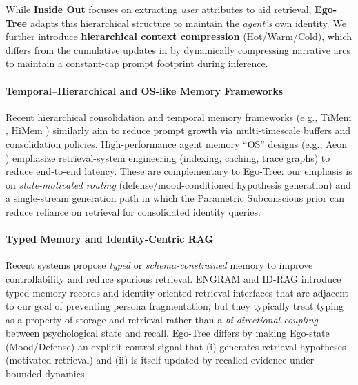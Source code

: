 \documentclass{article}
\begin{document}
While \textbf{Inside Out} focuses on extracting \textit{user} attributes to aid retrieval, \textbf{Ego-Tree} adapts this hierarchical structure to maintain the \textit{agent's} own identity. We further introduce \textbf{hierarchical context compression} (Hot/Warm/Cold), which differs from the cumulative updates in \cite{zhao2026inside} by dynamically compressing narrative arcs to maintain a constant-cap prompt footprint during inference.

\paragraph{Temporal--Hierarchical and OS-like Memory Frameworks}
Recent hierarchical consolidation and temporal memory frameworks (e.g., TiMem \cite{timem2025}, HiMem \cite{himem2025}) similarly aim to reduce prompt growth via multi-timescale buffers and consolidation policies. High-performance agent memory ``OS'' designs (e.g., Aeon \cite{aeon2025}) emphasize retrieval-system engineering (indexing, caching, trace graphs) to reduce end-to-end latency. These are complementary to Ego-Tree: our emphasis is on \emph{state-motivated routing} (defense/mood-conditioned hypothesis generation) and a single-stream generation path in which the Parametric Subconscious prior can reduce reliance on retrieval for consolidated identity queries.

\paragraph{Typed Memory and Identity-Centric RAG}
Recent systems propose \emph{typed} or \emph{schema-constrained} memory to improve controllability and reduce spurious retrieval. ENGRAM and ID-RAG introduce typed memory records and identity-oriented retrieval interfaces that are adjacent to our goal of preventing persona fragmentation, but they typically treat typing as a property of storage and retrieval rather than a \emph{bi-directional coupling} between psychological state and recall. Ego-Tree differs by making Ego-state (Mood/Defense) an explicit control signal that (i) generates retrieval hypotheses (motivated retrieval) and (ii) is itself updated by recalled evidence under bounded dynamics.
\end{document}
